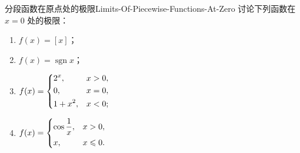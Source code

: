 \begin{problem}{分段函数在原点处的极限}{Limits-Of-Piecewise-Functions-At-Zero}
    讨论下列函数在 $x = 0$ 处的极限：
    \begin{enumerate}
        \item $f(x) = [x]$；
        \item $f(x) = \operatorname{sgn} x$；
        \item $f(x) = \begin{dcases} 2^x, & x > 0, \\ 0, & x = 0, \\ 1 + x^2, & x < 0; \end{dcases}$
        \item $f(x) = \begin{dcases} \cos \frac{1}{x}, & x > 0, \\ x, & x \leqslant 0. \end{dcases}$
    \end{enumerate}
\end{problem}

